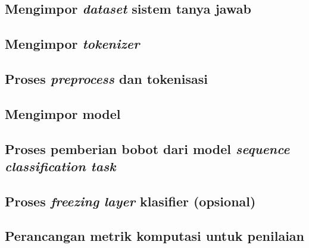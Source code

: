 \subsection{Mengimpor \emph{dataset} sistem tanya jawab}

\subsection{Mengimpor \emph{tokenizer}}

\subsection{Proses \emph{preprocess} dan tokenisasi}

\subsection{Mengimpor model}

\subsection{Proses pemberian bobot dari model \emph{sequence classification task}}

\subsection{Proses \emph{freezing layer} klasifier (opsional)}

\subsection{Perancangan metrik komputasi untuk penilaian}

